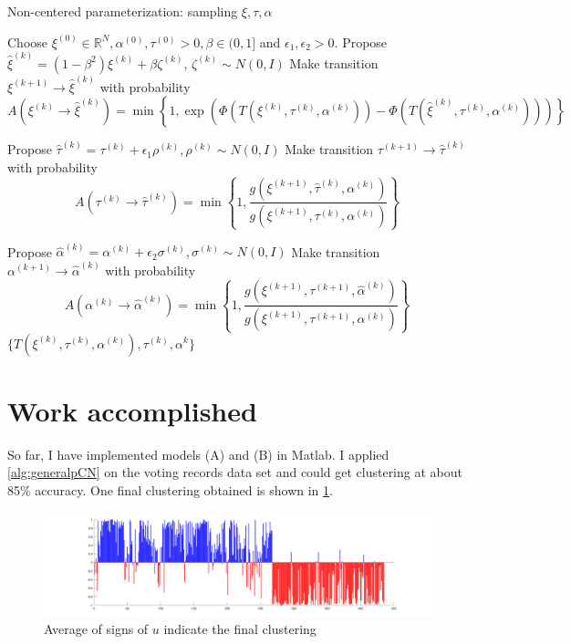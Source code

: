 \documentclass{siamart1116}
\begin{document}
\begin{algorithm}
\caption{Non-centered parameterization: sampling $\xi, \tau, \alpha$}
\label{alg:xi_tau_alpha}
\begin{algorithmic}
\State Choose $\xi^{(0)} \in \mathbb{R}^N, \alpha^{(0)}, \tau^{(0)} > 0, \beta \in (0, 1]$ and $\epsilon_1, \epsilon_2 > 0$.
\State Propose $\hat\xi^{(k)} = (1-\beta^2)\xi^{(k)} + \beta \zeta^{(k)}$, $\zeta^{(k)} \sim N(0, I)$
\State Make transition $\xi^{(k+1)} \to \hat\xi^{(k)}$ with probability
\[ A(\xi^{(k)} \to \hat\xi^{(k)}) = \min\left\{1, \exp\left(\Phi(T(\xi^{(k)},\tau^{(k)},\alpha^{(k)})) - \Phi(T(\hat\xi^{(k)},\tau^{(k)},\alpha^{(k)}))\right) \right\}\] 

\State Propose $\hat\tau^{(k)} = \tau^{(k)} + \epsilon_1 \rho^{(k)}, \rho^{(k)} \sim N(0,I)$
\State Make transition $\tau^{(k+1)} \to \hat\tau^{(k)}$ with probability
\[ A(\tau^{(k)} \to \hat\tau^{(k)}) = \min\left\{1, \frac{g(\xi^{(k+1)},\hat\tau^{(k)},\alpha^{(k)})}{g(\xi^{(k+1)},\tau^{(k)},\alpha^{(k)})} \right\}\] 

\State Propose $\hat\alpha^{(k)} = \alpha^{(k)} + \epsilon_2 \sigma^{(k)}, \sigma^{(k)} \sim N(0,I)$
\State Make transition $\alpha^{(k+1)} \to \hat\alpha^{(k)}$ with probability
\[ A(\alpha^{(k)} \to \hat\alpha^{(k)}) = \min\left\{1, \frac{g(\xi^{(k+1)},\tau^{(k+1)},\hat \alpha^{(k)})}{g(\xi^{(k+1)},\tau^{(k+1)},\alpha^{(k)})} \right\}\]
\EndFor
\State \Return $\{ T(\xi^{(k)},\tau^{(k)},\alpha^{(k)}), \tau^{(k)}, \alpha^{k} \}$
\end{algorithmic}
\end{algorithm}




\section{Work accomplished}
So far, I have implemented models (A) and (B) in Matlab. I applied \cref{alg:generalpCN} on the voting records data set and could get clustering at about 85\% accuracy. One final clustering obtained is shown in \cref{fig:mcmc_gamma_final}.
\begin{figure}[!htb]
\label{fig:mcmc_gamma_final}
\caption{Average of signs of $u$ indicate the final clustering}
\includegraphics[width = \linewidth]{mcmc_gamma/manycorrect_clustering.png}
\end{figure}
\end{document}
